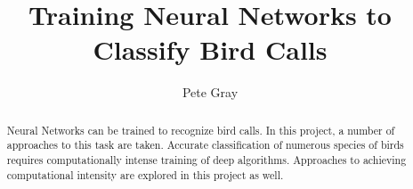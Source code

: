 \documentclass[sigconf]{acmart}
\begin{document}
\title{Training Neural Networks to Classify Bird Calls}

\author{Pete Gray}

\renewcommand{\shortauthors}{Gray}

\begin{abstract}
  Neural Networks can be trained to recognize bird calls. In this project,
  a number of approaches to this task are taken. Accurate classification of
  numerous species of birds requires computationally intense training of
  deep algorithms. Approaches to achieving computational 
  intensity are explored in this project as well.
\end{abstract}
\end{document}
